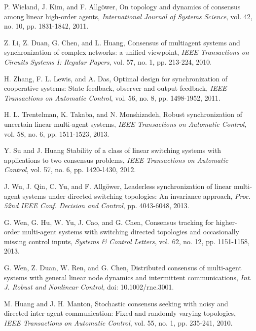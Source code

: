 \documentclass[letterpaper, 10 pt, conference]{ieeeconf}
\begin{document}
\begin{thebibliography}{99}
P. Wieland, J. Kim, and F. Allg\"{o}wer,
On topology and dynamics of consensus among linear high-order agents,
\emph{International Journal of Systems Science}, vol. 42, no. 10, pp. 1831-1842, 2011.


Z. Li, Z. Duan, G. Chen, and L. Huang,
Consensus of multiagent systems
and synchronization of complex networks: a unified viewpoint,
\emph{IEEE Transactions on Circuits Systems I: Regular Papers},
vol. 57, no. 1, pp. 213-224, 2010.

H. Zhang, F. L. Lewis, and A. Das,
Optimal design for synchronization of cooperative
systems: State feedback, observer and output feedback,
\emph{IEEE Transactions on Automatic Control}, vol. 56, no. 8, pp. 1498-1952, 2011.

H. L. Trentelman, K. Takaba, and N. Monshizadeh,
Robust synchronization
of uncertain linear multi-agent systems,
 \emph{IEEE Transactions on Automatic Control}, vol. 58, no. 6, pp. 1511-1523, 2013.


Y. Su and J. Huang
Stability of a class of linear switching systems with applications to two consensus problems,
\emph{IEEE Transactions on Automatic Control}, vol. 57, no. 6, pp. 1420-1430, 2012.

J. Wu, J. Qin, C. Yu, and F. Allg\"{o}wer,
Leaderless synchronization of linear multi-agent systems under
directed switching topologies: An invariance approach,
\emph{Proc. 52nd IEEE Conf. Decision and Control}, pp. 4043-6048, 2013.

G. Wen, G. Hu, W. Yu, J. Cao, and G. Chen,
Consensus tracking for higher-order multi-agent systems with switching directed topologies and occasionally missing control inputs,
\emph{Systems \& Control Letters}, vol. 62, no. 12, pp. 1151-1158, 2013.

G. Wen, Z. Duan, W. Ren, and G. Chen,
Distributed consensus of multi-agent systems with general linear
node dynamics and intermittent communications,
\emph{Int. J. Robust and Nonlinear Control}, doi: 10.1002/rnc.3001.

M. Huang and J. H. Manton, Stochastic consensus seeking with noisy and directed
inter-agent communication: Fixed and
randomly varying topologies,
\emph{IEEE Transactions on Automatic Control}, vol. 55, no. 1, pp. 235-241, 2010.


\end{thebibliography}
\end{document}
